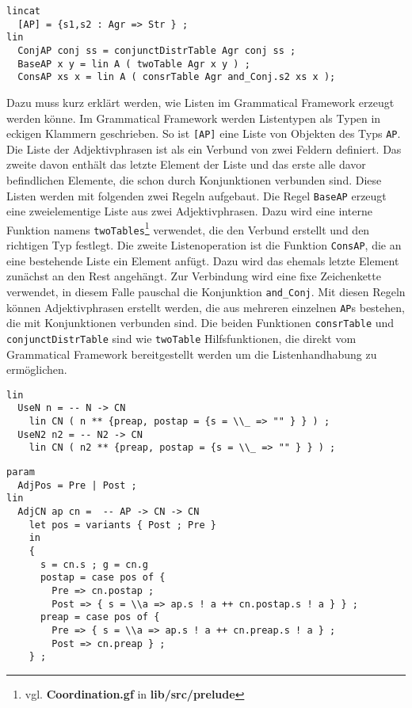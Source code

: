 \begin{lstlisting}[float=h!tp,caption={Der Listentyp Für Adjektivphrasen und die Funktionen zum Erstellen und Verwenden (vgl. \textbf{ConjunctionLat.gf}},label={GF-Conjunction-AP}]
lincat
  [AP] = {s1,s2 : Agr => Str } ;
lin
  ConjAP conj ss = conjunctDistrTable Agr conj ss ;
  BaseAP x y = lin A ( twoTable Agr x y ) ;
  ConsAP xs x = lin A ( consrTable Agr and_Conj.s2 xs x );
\end{lstlisting}
Dazu muss kurz erklärt werden, wie Listen im Grammatical Framework erzeugt werden könne. Im Grammatical Framework werden Listentypen als Typen in eckigen Klammern geschrieben. So ist \texttt{[AP]} eine Liste von Objekten des Typs \texttt{AP}. Die Liste der Adjektivphrasen ist als ein Verbund von zwei Feldern definiert. Das zweite davon enthält das letzte Element der Liste und das erste alle davor befindlichen Elemente, die schon durch Konjunktionen verbunden sind. Diese Listen werden mit folgenden zwei Regeln aufgebaut. Die Regel \texttt{BaseAP} erzeugt eine zweielementige Liste aus zwei Adjektivphrasen. Dazu wird eine interne Funktion namens \texttt{twoTables}\footnote{vgl. \textbf{Coordination.gf} in \textbf{lib/src/prelude}} verwendet, die den Verbund erstellt und den richtigen Typ festlegt. Die zweite Listenoperation ist die Funktion \texttt{ConsAP}, die an eine bestehende Liste ein Element anfügt. Dazu wird das ehemals letzte Element zunächst an den Rest angehängt. Zur Verbindung wird eine fixe Zeichenkette verwendet, in diesem Falle pauschal die Konjunktion \texttt{and\_Conj}. Mit diesen Regeln können Adjektivphrasen erstellt werden, die aus mehreren einzelnen \texttt{AP}s bestehen, die mit Konjunktionen verbunden sind. Die beiden Funktionen \texttt{consrTable} und \texttt{conjunctDistrTable} sind wie \texttt{twoTable} Hilfsfunktionen, die direkt vom Grammatical Framework bereitgestellt werden um die Listenhandhabung zu ermöglichen. \par
\begin{lstlisting}[float=h!tp,caption={Die Syntaxregeln \texttt{UseN} und \texttt{UseN2} um ein Nomen als \texttt{CN} zu verwenden (vgl. \textbf{NounLat.gf}},label={GF-Noun-DetCN}]
lin
  UseN n = -- N -> CN
    lin CN ( n ** {preap, postap = {s = \\_ => "" } } ) ;     
  UseN2 n2 = -- N2 -> CN
    lin CN ( n2 ** {preap, postap = {s = \\_ => "" } } ) ; 
\end{lstlisting}
\begin{lstlisting}[float=h!tp,caption={Die Syntaxregeln \texttt{AdjCN} um ein Common Noun mit einer Adjektivphrase zu erweitern (vgl. \textbf{NounLat.gf}},label={GF-Noun-AdjCN}]
param
  AdjPos = Pre | Post ;
lin
  AdjCN ap cn =  -- AP -> CN -> CN
    let pos = variants { Post ; Pre }
    in
    {
      s = cn.s ; g = cn.g
      postap = case pos of { 
        Pre => cn.postap ; 
        Post => { s = \\a => ap.s ! a ++ cn.postap.s ! a } } ;
      preap = case pos of { 
        Pre => { s = \\a => ap.s ! a ++ cn.preap.s ! a } ; 
        Post => cn.preap } ;
    } ;
\end{lstlisting}
